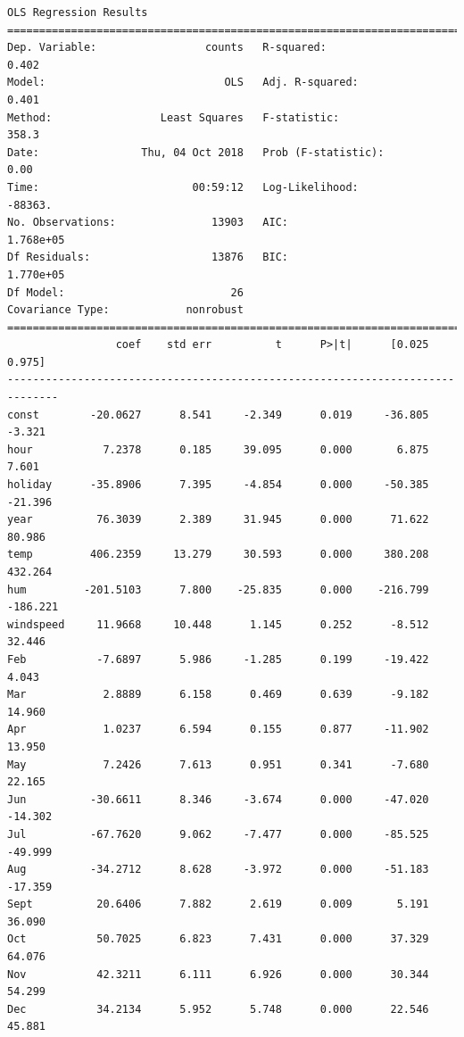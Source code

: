 \documentclass[11pt]{article}
\begin{document}
    \begin{Verbatim}[commandchars=\\\{\}]
                            OLS Regression Results                            
==============================================================================
Dep. Variable:                 counts   R-squared:                       0.402
Model:                            OLS   Adj. R-squared:                  0.401
Method:                 Least Squares   F-statistic:                     358.3
Date:                Thu, 04 Oct 2018   Prob (F-statistic):               0.00
Time:                        00:59:12   Log-Likelihood:                -88363.
No. Observations:               13903   AIC:                         1.768e+05
Df Residuals:                   13876   BIC:                         1.770e+05
Df Model:                          26                                         
Covariance Type:            nonrobust                                         
==============================================================================
                 coef    std err          t      P>|t|      [0.025      0.975]
------------------------------------------------------------------------------
const        -20.0627      8.541     -2.349      0.019     -36.805      -3.321
hour           7.2378      0.185     39.095      0.000       6.875       7.601
holiday      -35.8906      7.395     -4.854      0.000     -50.385     -21.396
year          76.3039      2.389     31.945      0.000      71.622      80.986
temp         406.2359     13.279     30.593      0.000     380.208     432.264
hum         -201.5103      7.800    -25.835      0.000    -216.799    -186.221
windspeed     11.9668     10.448      1.145      0.252      -8.512      32.446
Feb           -7.6897      5.986     -1.285      0.199     -19.422       4.043
Mar            2.8889      6.158      0.469      0.639      -9.182      14.960
Apr            1.0237      6.594      0.155      0.877     -11.902      13.950
May            7.2426      7.613      0.951      0.341      -7.680      22.165
Jun          -30.6611      8.346     -3.674      0.000     -47.020     -14.302
Jul          -67.7620      9.062     -7.477      0.000     -85.525     -49.999
Aug          -34.2712      8.628     -3.972      0.000     -51.183     -17.359
Sept          20.6406      7.882      2.619      0.009       5.191      36.090
Oct           50.7025      6.823      7.431      0.000      37.329      64.076
Nov           42.3211      6.111      6.926      0.000      30.344      54.299
Dec           34.2134      5.952      5.748      0.000      22.546      45.881

\end{Verbatim}
\end{document}
